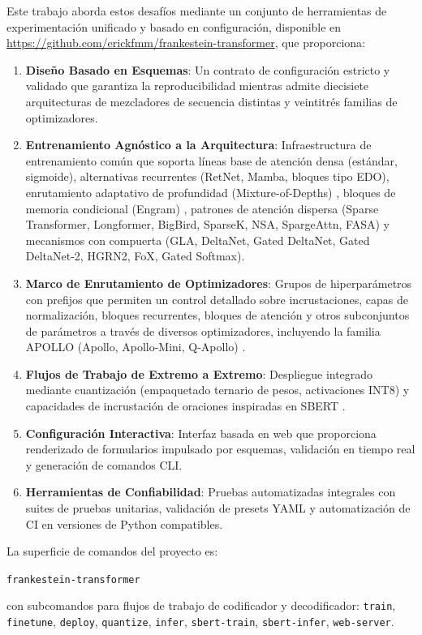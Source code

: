 \documentclass[11pt,a4paper]{article}
\begin{document}
Este trabajo aborda estos desafíos mediante un conjunto de herramientas de experimentación unificado y basado en configuración, disponible en \url{https://github.com/erickfmm/frankestein-transformer}, que proporciona:
\begin{enumerate}[leftmargin=*]
    \item \textbf{Diseño Basado en Esquemas}: Un contrato de configuración estricto y validado que garantiza la reproducibilidad mientras admite diecisiete arquitecturas de mezcladores de secuencia distintas y veintitrés familias de optimizadores.
    \item \textbf{Entrenamiento Agnóstico a la Arquitectura}: Infraestructura de entrenamiento común que soporta líneas base de atención densa (estándar, sigmoide), alternativas recurrentes (RetNet, Mamba, bloques tipo EDO), enrutamiento adaptativo de profundidad (Mixture-of-Depths) \citep{zhu2026mixtureofdepthsattention}, bloques de memoria condicional (Engram) \citep{cheng2026conditionalmemoryscalablelookup}, patrones de atención dispersa (Sparse Transformer, Longformer, BigBird, SparseK, NSA, SpargeAttn, FASA) y mecanismos con compuerta (GLA, DeltaNet, Gated DeltaNet, Gated DeltaNet-2, HGRN2, FoX, Gated Softmax).
    \item \textbf{Marco de Enrutamiento de Optimizadores}: Grupos de hiperparámetros con prefijos que permiten un control detallado sobre incrustaciones, capas de normalización, bloques recurrentes, bloques de atención y otros subconjuntos de parámetros a través de diversos optimizadores, incluyendo la familia APOLLO (Apollo, Apollo-Mini, Q-Apollo) \citep{zhu2025apollosgdlikememoryadamwlevel}.
    \item \textbf{Flujos de Trabajo de Extremo a Extremo}: Despliegue integrado mediante cuantización (empaquetado ternario de pesos, activaciones INT8) y capacidades de incrustación de oraciones inspiradas en SBERT \citep{reimers_sentence-bert_2019}.
    \item \textbf{Configuración Interactiva}: Interfaz basada en web que proporciona renderizado de formularios impulsado por esquemas, validación en tiempo real y generación de comandos CLI.
    \item \textbf{Herramientas de Confiabilidad}: Pruebas automatizadas integrales con suites de pruebas unitarias, validación de presets YAML y automatización de CI en versiones de Python compatibles.
\end{enumerate}

La superficie de comandos del proyecto es:
\begin{center}
\texttt{frankestein-transformer}
\end{center}
con subcomandos para flujos de trabajo de codificador y decodificador:
\texttt{train}, \texttt{finetune}, \texttt{deploy}, \texttt{quantize}, \texttt{infer}, \texttt{sbert-train}, \texttt{sbert-infer}, \texttt{web-server}.
\end{document}
